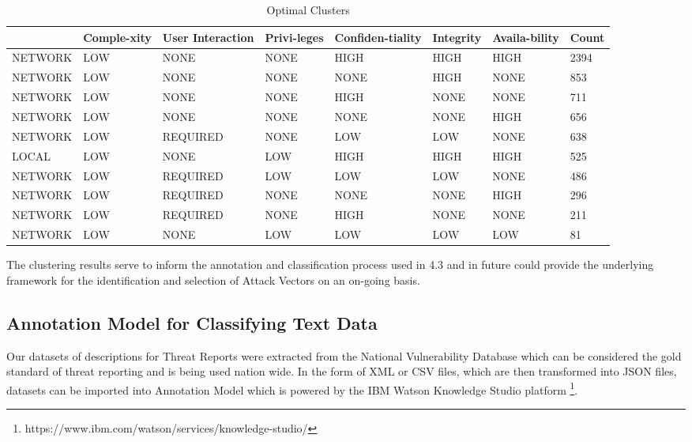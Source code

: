 \documentclass{article} %
\begin{document}
\begin{table}[h!]
\begin{center}
\begin{tabular}{ |l|p{1.3cm}|l|p{1.1cm}|p{1.4cm}|p{1.1cm}|p{1.4cm}|p{1.1cm}| } \hline
\small{Attack Vector & Comple-xity & User Interaction & Privi-leges & Confiden-tiality & Integrity & Availa-bility & Count} \\ \hline
NETWORK & LOW & NONE & NONE & HIGH & HIGH & HIGH & 2394 \\
NETWORK & LOW & NONE & NONE & NONE & HIGH & NONE & 853 \\
NETWORK & LOW & NONE & NONE & HIGH & NONE & NONE & 711 \\
NETWORK & LOW & NONE & NONE & NONE & NONE & HIGH & 656 \\
NETWORK & LOW & REQUIRED & NONE & LOW & LOW & NONE & 638 \\ 
LOCAL & LOW & NONE & LOW & HIGH & HIGH & HIGH & 525 \\
NETWORK & LOW & REQUIRED & LOW & LOW & LOW & NONE & 486 \\
NETWORK & LOW & REQUIRED & NONE & NONE & NONE & HIGH & 296 \\
NETWORK & LOW & REQUIRED & NONE & HIGH & NONE & NONE & 211 \\
NETWORK & LOW & NONE & LOW & LOW & LOW & LOW & 81 \\
\hline
\end{tabular}
\caption{Optimal Clusters}
\end{center}
\label{table:1}
\end{table}

The clustering results serve to inform the annotation and classification process used in 4.3 and in future could provide the underlying framework for the identification and selection of Attack Vectors on an on-going basis.


\subsection{Annotation Model for Classifying Text Data}
Our datasets of descriptions for Threat Reports were extracted from the National Vulnerability Database which can be considered the gold standard of threat reporting and is being used nation wide. In the form of XML or CSV files, which are then transformed into JSON files, datasets can be imported into Annotation Model which is powered by the IBM Watson Knowledge Studio platform \footnote{https://www.ibm.com/watson/services/knowledge-studio/}.
\end{document}
